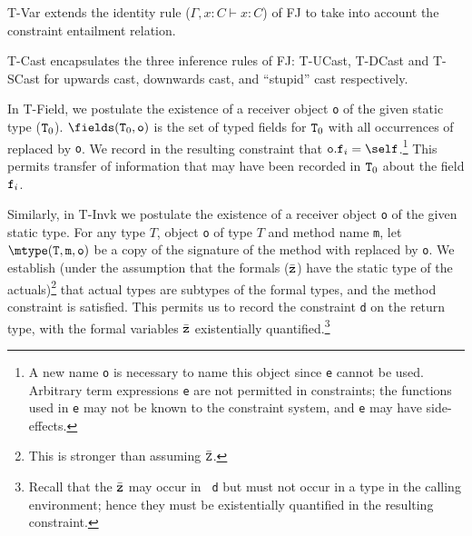 \def\TConstr{\mbox{\sc T-Constr}}
\def\TInv{\mbox{\sc T-Inv}}
\def\TVar{\mbox{\sc T-Var}}
\def\TField{\mbox{\sc T-Field}}
\def\TInvk{\mbox{\sc T-Invk}}
\def\TNew{\mbox{\sc T-New}}
\def\TCast{\mbox{\sc T-Cast}}
\def\TUCast{\mbox{\sc T-UCast}}
\def\TDCast{\mbox{\sc T-DCast}}
\def\TSCast{\mbox{\sc T-SCast}}

\TVar{} extends the identity rule ($\Gamma, x:C \vdash x:C$) of {\sf FJ} to take into account the constraint entailment relation.

\TCast{} encapsulates the three inference rules of {\sf FJ}:
\TUCast{}, \TDCast{} and \TSCast{} for upwards cast, downwards cast, and ``stupid'' cast respectively. 


In \TField, we postulate the existence of a receiver object {\tt o} of
the given static type (${\tt T}_0$). $\fields({\tt T}_0,{\tt o})$ is
the set of typed fields for ${\tt T}_0$ with all occurrences of 
\this{} replaced  by {\tt o}. We record in the resulting
constraint that ${\tt o.f}_i=\self$.\footnote{A new name {\tt o} is
necessary to name this object since {\tt e} cannot be used. Arbitrary
term expressions {\tt e} are not permitted in constraints; the
functions used in {\tt e} may not be known to the constraint system,
and {\tt e} may have side-effects.}  This permits transfer of
information that may have been recorded in ${\tt T}_0$ about the field
${\tt f}_i$. 

Similarly, in \TInvk{} we postulate the existence of a receiver object
{\tt o} of the given static type. For any type $T$, object {\tt o} of
type $T$ and method name {\tt m}, let $\mtype({\tt T},{\tt m},{\tt
o})$ be a copy of the signature of the method with \this{} replaced by
{\tt o}. We establish (under the assumption that the formals
($\bar{\tt z}$) have the static type of the actuals)\footnote{This is
stronger than assuming $\bar{\tt Z}$.}  that actual types are subtypes
of the formal types, and the method constraint is satisfied. This
permits us to record the constraint {\tt d} on the return type, with
the formal variables $\bar{\tt z}$ existentially
quantified.\footnote{Recall that the $\bar{\tt z}$ may occur in {\tt
d} but must not occur in a type in the calling environment; hence they
must be existentially quantified in the resulting constraint.}

